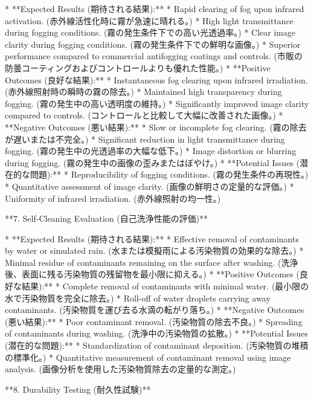 \documentclass{article}
\begin{document}
*   **Expected Results (期待される結果):**
    *   Rapid clearing of fog upon infrared activation. (赤外線活性化時に霧が急速に晴れる。)
    *   High light transmittance during fogging conditions. (霧の発生条件下での高い光透過率。)
    *   Clear image clarity during fogging conditions. (霧の発生条件下での鮮明な画像。)
    *   Superior performance compared to commercial antifogging coatings and controls. (市販の防曇コーティングおよびコントロールよりも優れた性能。)
*   **Positive Outcomes (良好な結果):**
    *   Instantaneous fog clearing upon infrared irradiation. (赤外線照射時の瞬時の霧の除去。)
    *   Maintained high transparency during fogging. (霧の発生中の高い透明度の維持。)
    *   Significantly improved image clarity compared to controls. (コントロールと比較して大幅に改善された画像。)
*   **Negative Outcomes (悪い結果):**
    *   Slow or incomplete fog clearing. (霧の除去が遅いまたは不完全。)
    *   Significant reduction in light transmittance during fogging. (霧の発生中の光透過率の大幅な低下。)
    *   Image distortion or blurring during fogging. (霧の発生中の画像の歪みまたはぼやけ。)
*   **Potential Issues (潜在的な問題):**
    *   Reproducibility of fogging conditions. (霧の発生条件の再現性。)
    *   Quantitative assessment of image clarity. (画像の鮮明さの定量的な評価。)
    *   Uniformity of infrared irradiation. (赤外線照射の均一性。)

**7. Self-Cleaning Evaluation (自己洗浄性能の評価)**

*   **Expected Results (期待される結果):**
    *   Effective removal of contaminants by water or simulated rain. (水または模擬雨による汚染物質の効果的な除去。)
    *   Minimal residue of contaminants remaining on the surface after washing. (洗浄後、表面に残る汚染物質の残留物を最小限に抑える。)
*   **Positive Outcomes (良好な結果):**
    *   Complete removal of contaminants with minimal water. (最小限の水で汚染物質を完全に除去。)
    *   Roll-off of water droplets carrying away contaminants. (汚染物質を運び去る水滴の転がり落ち。)
*   **Negative Outcomes (悪い結果):**
    *   Poor contaminant removal. (汚染物質の除去不良。)
    *   Spreading of contaminants during washing. (洗浄中の汚染物質の拡散。)
*   **Potential Issues (潜在的な問題):**
    *   Standardization of contaminant deposition. (汚染物質の堆積の標準化。)
    *   Quantitative measurement of contaminant removal using image analysis. (画像分析を使用した汚染物質除去の定量的な測定。)

**8. Durability Testing (耐久性試験)**
\end{document}
